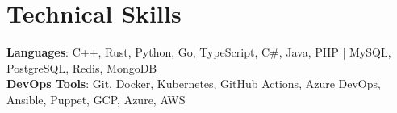 \section{Technical Skills}
\begin{itemize}[leftmargin=0.15in, label={}]
    \small{\item{
        \textbf{Languages}{: C++, Rust, Python, Go, TypeScript, C\#, Java, PHP | MySQL, PostgreSQL, Redis, MongoDB} \\
        \textbf{DevOps Tools}{: Git, Docker, Kubernetes, GitHub Actions, Azure DevOps, Ansible, Puppet, GCP, Azure, AWS} \\
    }}
\end{itemize}

